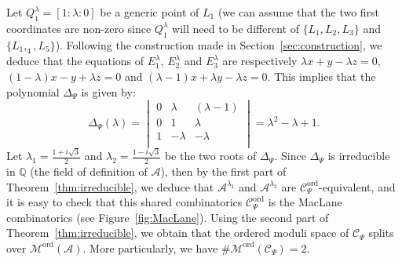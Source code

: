 \documentclass[11pt, a4paper]{amsart}
\theoremstyle{definition}
\theoremstyle{remark}
\newcommand{\QQ}{\mathds{Q}}
\newcommand{\A}{\mathcal{A}}
\newcommand{\C}{\mathcal{C}}
\newcommand{\M}{\mathcal{M}}
\newcommand{\ord}{\text{ord}}
\begin{document}
Let $Q^\lambda_1 = [1:\lambda:0]$ be a generic point of $L_1$ (we can assume that the two first coordinates are non-zero since $Q_1^\lambda$ will need to be different of $\{L_1,L_2,L_3\}$ and $\{L_1,_4,L_5\}$). Following the construction made in Section~\ref{sec:construction}, we deduce that the equations of $E^\lambda_1$, $E^\lambda_2$ and $E^\lambda_3$ are respectively $\lambda x + y  - \lambda z = 0$,  $(1-\lambda)x -y + \lambda z = 0$ and $(\lambda - 1)x + \lambda y -\lambda z = 0$. This implies that the polynomial $\Delta_{\Psi}$ is given by:
\begin{equation*}
	\Delta_{\Psi}(\lambda) = 
	\begin{vmatrix}
		0 & \lambda & (\lambda - 1) \\
		0 & 1 & \lambda \\
		1 & -\lambda & -\lambda \\
	\end{vmatrix}
	= \lambda^2 - \lambda + 1.
\end{equation*}
Let $\lambda_1=\frac{1+i\sqrt{3}}{2}$ and $\lambda_2=\frac{1-i\sqrt{3}}{2}$ be the two roots of $\Delta_{\Psi}$. Since $\Delta_{\Psi}$ is irreducible in $\QQ$ (the field of definition of $\A$), then by the first part of Theorem~\ref{thm:irreducible}, we deduce that $\A^{\lambda_1}$ and $\A^{\lambda_2}$ are $\C_\Psi^\ord$-equivalent, and it is easy to check that this shared combinatorics $\C_\Psi^\ord$ is the MacLane combinatorics (see Figure~\ref{fig:MacLane}). Using the second part of Theorem~\ref{thm:irreducible}, we obtain that the ordered moduli space of $\C_\Psi$ splits over $\M^\ord(\A)$. More particularly, we have $\# \M^\ord(\C_\Psi)=2$.
\end{document}

